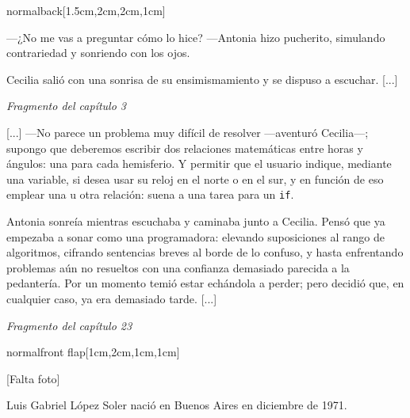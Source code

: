 \documentclass[coverwidth=148mm, coverheight=210mm, spinewidth=30mm,
flapwidth=7cm, wrapwidth=5mm, 11pt]{bookcover}
\begin{document}
\begin{bookcover}
\begin{bookcoverelement}{normal}{back}[1.5cm,2cm,2cm,1cm]
{      \hspace{.5em} ---¿No me vas a preguntar cómo lo hice? ---Antonia
      hizo pucherito, simulando contrariedad y sonriendo con los ojos.

      \hspace{.5em} Cecilia salió con una sonrisa de su
      ensimismamiento y se dispuso a escuchar. [...]
  

  \begin{flushright}
    \emph{Fragmento del capítulo 3}
  \end{flushright}

  \vspace{2.5em}
  
  \hspace{.5em} [...] ---No parece un problema muy difícil de resolver
  ---a\-ven\-tu\-ró Cecilia---; supongo que deberemos escribir dos
  relaciones matemáticas entre horas y ángulos: una para cada
  hemisferio. Y permitir que el usuario indique, mediante una
  variable, si desea usar su reloj en el norte o en el sur, y en
  función de eso emplear una u otra relación: suena a una tarea para
  un \texttt{if}.

  \hspace{.5em} Antonia sonreía mientras escuchaba y caminaba junto a
  Cecilia. Pensó que ya empezaba a sonar como una programadora:
  elevando suposiciones al rango de algoritmos, cifrando sentencias
  breves al borde de lo confuso, y hasta enfrentando problemas aún no
  resueltos con una confianza demasiado parecida a la pedantería. Por
  un momento temió estar echándola a perder; pero decidió que, en
  cualquier caso, ya era demasiado tarde. [...]

  \begin{flushright}
    \emph{Fragmento del capítulo 23}
  \end{flushright}
}
  
  \end{bookcoverelement}

  \begin{bookcoverelement}{normal}{front flap}[1cm,2cm,1cm,1cm]

    \begin{center}
      \vspace{2cm}
      [Falta foto]
      \vspace{2cm}
    \end{center}

    \bigskip
    
    \color{black} Luis Gabriel López Soler nació en Buenos Aires en
    diciembre de 1971.


\end{bookcoverelement}
\end{bookcover}
\end{document}

